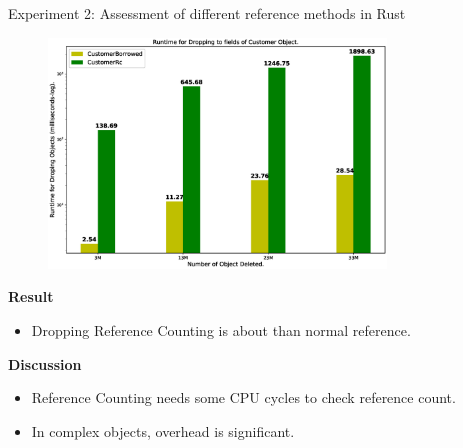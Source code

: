 \documentclass[9pt]{beamer}
\begin{document}
\begin{frame}[fragile]{Experiment 2: Assessment of different reference methods in Rust}
    \vspace{-0.5cm}
    \begin{figure}[hp]
        \centering
        \begin{center}
                \includegraphics[width=0.8\textwidth]{images/rust_droptime_borring_rc.eps}
                \captionsetup{labelformat=empty}
        \end{center}
    \end{figure}
\vspace{-0.5cm}
    \textbf{Result}
    \begin{itemize}
        \item Dropping Reference Counting is about  than normal reference.
    \end{itemize}

    \textbf{Discussion}
    \begin{itemize}
        \item Reference Counting needs some CPU cycles to check reference count.
        \item In complex objects, overhead is significant.
    \end{itemize}
\end{frame}

\end{document}
